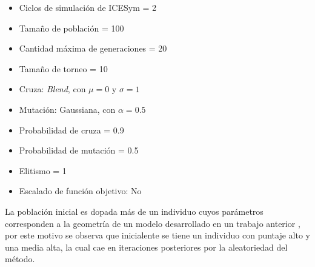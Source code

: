 \begin{itemize}
        \item Ciclos de simulación de ICESym = 2
        \item Tamaño de población = 100
        \item Cantidad máxima de generaciones = 20
        \item Tamaño de torneo =  10
        \item Cruza: \emph{Blend}, con $\mu = 0$ y $\sigma = 1$
        \item Mutación: Gaussiana, con $\alpha = 0.5$
        \item Probabilidad de cruza = 0.9
        \item Probabilidad de mutación = 0.5
        \item Elitismo = 1
        \item Escalado de función objetivo: No
\end{itemize}

La población inicial es dopada más de un individuo cuyos parámetros corresponden
a la geometría de un modelo desarrollado en un trabajo anterior \cite{lopez13},
por este motivo se observa que inicialente se tiene un individuo con puntaje
alto y una media alta, la cual cae en iteraciones posteriores por la
aleatoriedad del método.


